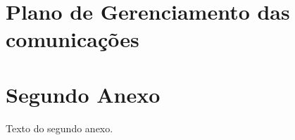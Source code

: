 \begin{anexosenv}

\partanexos

\chapter{Plano de Gerenciamento das comunicações}



\chapter{Segundo Anexo}

Texto do segundo anexo.

\end{anexosenv}

